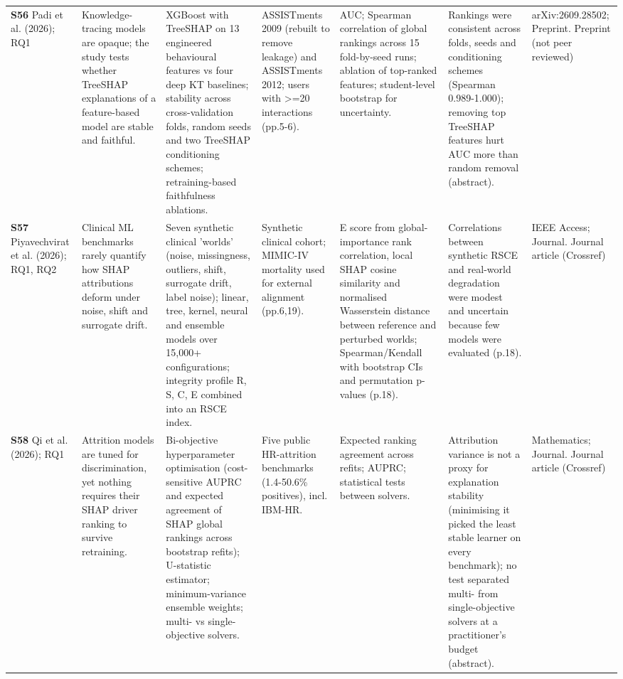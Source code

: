 \begin{longtable}{@{}P{1.55cm}P{2.9cm}P{4.5cm}P{3.2cm}P{3.4cm}P{4.6cm}P{3.6cm}@{}}
\textbf{S56} \cite{S56} Padi et al. (2026); RQ1 & Knowledge-tracing models are opaque; the study tests whether TreeSHAP explanations of a feature-based model are stable and faithful. & XGBoost with TreeSHAP on 13 engineered behavioural features vs four deep KT baselines; stability across cross-validation folds, random seeds and two TreeSHAP conditioning schemes; retraining-based faithfulness ablations. & ASSISTments 2009 (rebuilt to remove leakage) and ASSISTments 2012; users with \textgreater{}=20 interactions (pp.5-6). & AUC; Spearman correlation of global rankings across 15 fold-by-seed runs; ablation of top-ranked features; student-level bootstrap for uncertainty. & Rankings were consistent across folds, seeds and conditioning schemes (Spearman 0.989-1.000); removing top TreeSHAP features hurt AUC more than random removal (abstract). & arXiv:2609.28502; Preprint. Preprint (not peer reviewed) \\
\textbf{S57} \cite{S57} Piyavechvirat et al. (2026); RQ1, RQ2 & Clinical ML benchmarks rarely quantify how SHAP attributions deform under noise, shift and surrogate drift. & Seven synthetic clinical 'worlds' (noise, missingness, outliers, shift, surrogate drift, label noise); linear, tree, kernel, neural and ensemble models over 15,000+ configurations; integrity profile R, S, C, E combined into an RSCE index. & Synthetic clinical cohort; MIMIC-IV mortality used for external alignment (pp.6,19). & E score from global-importance rank correlation, local SHAP cosine similarity and normalised Wasserstein distance between reference and perturbed worlds; Spearman/\allowbreak{}Kendall with bootstrap CIs and permutation p-values (p.18). & Correlations between synthetic RSCE and real-world degradation were modest and uncertain because few models were evaluated (p.18). & IEEE Access; Journal. Journal article (Crossref) \\
\textbf{S58} \cite{S58} Qi et al. (2026); RQ1 & Attrition models are tuned for discrimination, yet nothing requires their SHAP driver ranking to survive retraining. & Bi-objective hyperparameter optimisation (cost-sensitive AUPRC and expected agreement of SHAP global rankings across bootstrap refits); U-statistic estimator; minimum-variance ensemble weights; multi- vs single-objective solvers. & Five public HR-attrition benchmarks (1.4-50.6\% positives), incl. IBM-HR. & Expected ranking agreement across refits; AUPRC; statistical tests between solvers. & Attribution variance is not a proxy for explanation stability (minimising it picked the least stable learner on every benchmark); no test separated multi- from single-objective solvers at a practitioner's budget (abstract). & Mathematics; Journal. Journal article (Crossref) \\

\end{longtable}
